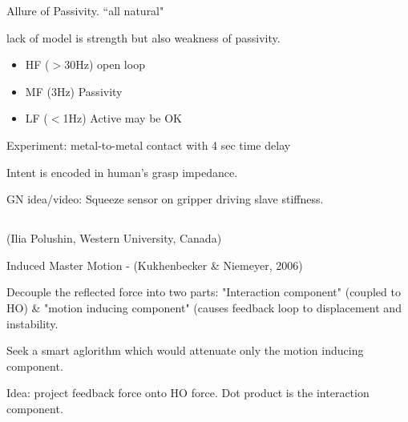 \documentclass[letterpaper]{article}
\begin{document}
Allure of Passivity. ``all natural"

lack of model is strength but also weakness of passivity.


\begin{itemize}  \item HF ($>$30Hz)    open loop
\item MF (3Hz)  Passivity
\item LF ($<$1Hz) Active may be OK
\end{itemize}

Experiment: metal-to-metal contact with 4 sec time delay

Intent is encoded in human's grasp impedance.  

GN idea/video: Squeeze sensor on gripper driving slave stiffness.

\subsection{} (Ilia Polushin, Western University, Canada)

Induced Master Motion - (Kukhenbecker \& Niemeyer, 2006)

Decouple the reflected force into two parts: "Interaction component" (coupled to HO)  \& "motion inducing component" (causes feedback loop to displacement and instability.

Seek a smart aglorithm which would attenuate only the motion inducing component.

Idea:  project feedback force onto HO force.   Dot product is the interaction component. 
\end{document}
